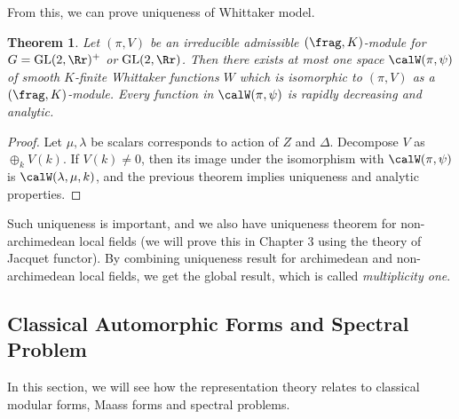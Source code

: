 \documentclass{article}
\newtheorem{theorem}{Theorem}[section]
\newcommand{\GL}{\mathrm{GL}}
\begin{document}
From this, we can prove uniqueness of Whittaker model.
\begin{theorem}
\label{archwit}
Let $(\pi, V)$ be an irreducible admissible $(\frag, K)$-module for $G = \GL(2, \Rr)^{+}$ or $\GL(2, \Rr)$. Then there exists at most one space $\calW(\pi, \psi)$ of smooth $K$-finite Whittaker functions $W$ which is isomorphic to $(\pi, V)$ as a $(\frag, K)$-module. Every function in $\calW(\pi, \psi)$ is rapidly decreasing and analytic. 
\end{theorem}
\begin{proof}
Let $\mu, \lambda$ be scalars corresponds to action of $Z$ and $\Delta$. Decompose $V$ as $\oplus_{k} V(k)$. If $V(k)\neq 0$, then its image under the isomorphism with $\calW(\pi, \psi)$ is $\calW(\lambda, \mu, k)$, and the previous theorem implies uniqueness and analytic properties. 
\end{proof}
Such uniqueness is important, and we also have uniqueness theorem for non-archimedean local fields (we will prove this in Chapter 3 using the theory of Jacquet functor). By combining uniqueness result for archimedean and non-archimedean local fields, we get the global result, which is called \emph{multiplicity one}. 

\subsection{Classical Automorphic Forms and Spectral Problem}
In this section, we will see how the representation theory relates to classical modular forms, Maass forms and spectral problems. 
\end{document}
